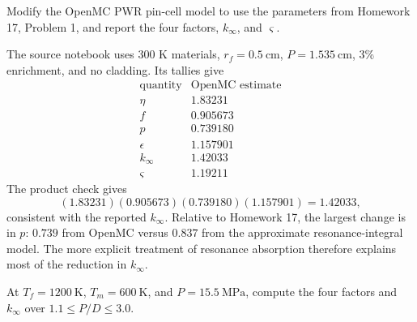 

Modify the OpenMC PWR pin-cell model to use the parameters from Homework 17,
Problem 1, and report the four factors, $k_\infty$, and $\varsigma$.

\begin{adaptedsolution}
The source notebook uses 300 K materials, $r_f=0.5~\mathrm{cm}$,
$P=1.535~\mathrm{cm}$, 3\% enrichment, and no cladding. Its tallies give
\[
\begin{array}{c|c}
\text{quantity} & \text{OpenMC estimate}\\ \hline
\eta & 1.83231\\
f & 0.905673\\
p & 0.739180\\
\epsilon & 1.157901\\
k_\infty & 1.42033\\
\varsigma & 1.19211
\end{array}
\]
The product check gives
\[
(1.83231)(0.905673)(0.739180)(1.157901)=1.42033,
\]
consistent with the reported $k_\infty$. Relative to Homework 17, the largest
change is in $p$: $0.739$ from OpenMC versus $0.837$ from the approximate
resonance-integral model. The more explicit treatment of resonance absorption
therefore explains most of the reduction in $k_\infty$.
\end{adaptedsolution}

\newpage
{}

At $T_f=1200~\mathrm{K}$, $T_m=600~\mathrm{K}$, and $P=15.5~\mathrm{MPa}$,
compute the four factors and $k_\infty$ over $1.1\le P/D\le3.0$.

